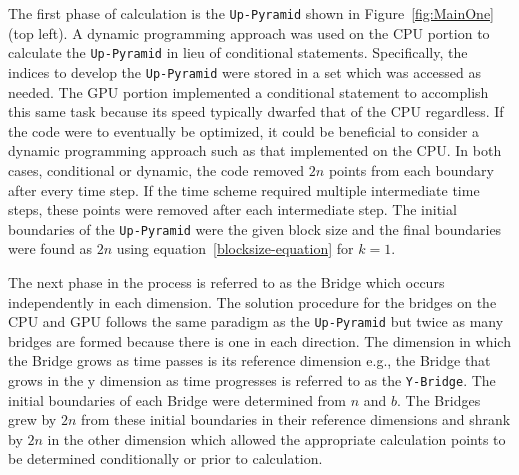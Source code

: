 \documentclass[preprints,article,accept,moreauthors,pdftex]{Definitions/mdpi}
\def\Up{\texttt{Up-Pyramid}}
\def\Yb{\texttt{Y-Bridge}}
\begin{document}
\par
The first phase of calculation is the \Up{} shown in Figure~\ref{fig:MainOne} (top left). A dynamic programming approach was used on the CPU portion to calculate the \Up{} in lieu of conditional statements. Specifically, the indices to develop the \Up{} were stored in a set which was accessed as needed. The GPU portion implemented a conditional statement to accomplish this same task because its speed typically dwarfed that of the CPU regardless. If the code were to eventually be optimized, it could be beneficial to consider a dynamic programming approach such as that implemented on the CPU. In both cases, conditional or dynamic, the code removed $2n$ points from each boundary after every time step. If the time scheme required multiple intermediate time steps, these points were removed after each intermediate step. The initial boundaries of the \Up{} were the given block size and the final boundaries were found as $2n$ using equation~\ref{blocksize-equation} for $k=1$.

\par The next phase in the process is referred to as the Bridge which occurs independently in each dimension. The solution procedure for the bridges on the CPU and GPU follows the same paradigm as the \Up{} but twice as many bridges are formed because there is one in each direction. The dimension in which the Bridge grows as time passes is its reference dimension e.g., the Bridge that grows in the y dimension as time progresses is referred to as the \Yb{}. The initial boundaries of each Bridge were determined from $n$ and $b$. The Bridges grew by $2n$ from these initial boundaries in their reference dimensions and shrank by $2n$ in the other dimension which allowed the appropriate calculation points to be determined conditionally or prior to calculation.
\end{document}
